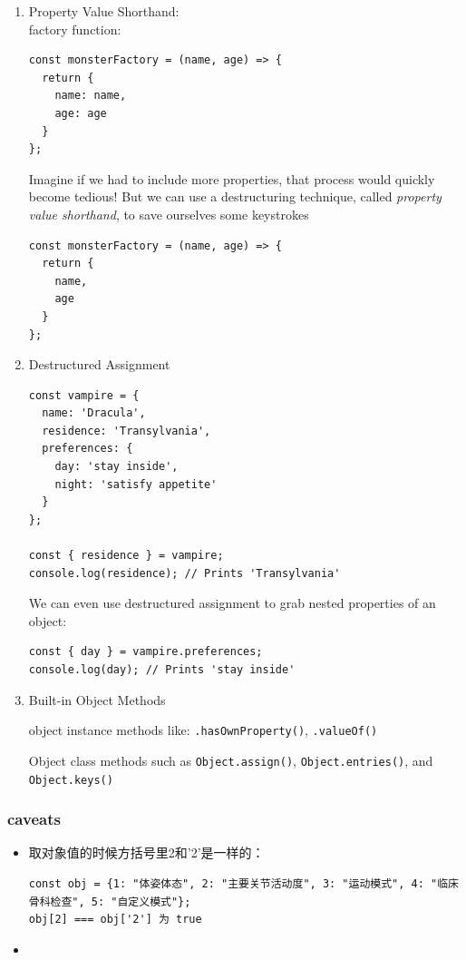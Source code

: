 \documentclass[a4paper, 12pt]{article}
\begin{document}
\begin{enumerate}
\item Property Value Shorthand:\\
factory function:
\begin{verbatim}
const monsterFactory = (name, age) => {
  return { 
    name: name,
    age: age
  }
};
\end{verbatim}

Imagine if we had to include more properties, that process would quickly become tedious! But we can use a destructuring technique, called \textit{property value shorthand}, to save ourselves some keystrokes
\begin{verbatim}
const monsterFactory = (name, age) => {
  return { 
    name,
    age 
  }
};
\end{verbatim}

\item Destructured Assignment
\begin{verbatim}
const vampire = {
  name: 'Dracula',
  residence: 'Transylvania',
  preferences: {
    day: 'stay inside',
    night: 'satisfy appetite'
  }
};

const { residence } = vampire; 
console.log(residence); // Prints 'Transylvania'
\end{verbatim}
We can even use destructured assignment to grab nested properties of an object:
\begin{verbatim}
const { day } = vampire.preferences; 
console.log(day); // Prints 'stay inside'
\end{verbatim}

\item Built-in Object Methods

object instance methods like: \verb|.hasOwnProperty()|, \verb|.valueOf()|

Object class methods such as \verb|Object.assign()|, \verb|Object.entries()|, and\\ \verb|Object.keys()|

\end{enumerate}

\subsubsection{caveats}
\begin{itemize}
\item 取对象值的时候方括号里2和'2'是一样的：
\begin{verbatim}
const obj = {1: "体姿体态", 2: "主要关节活动度", 3: "运动模式", 4: "临床骨科检查", 5: "自定义模式"};
obj[2] === obj['2'] 为 true
\end{verbatim}

\item 

\end{itemize}
\end{document}
